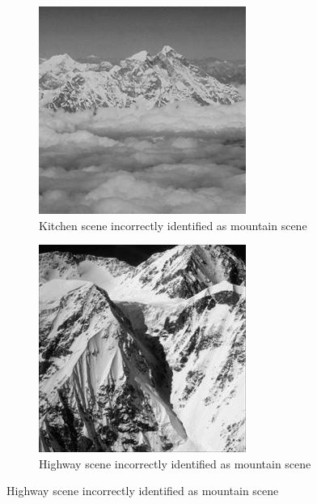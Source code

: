 \begin{homeworkProblem}
\begin{figure}[H]
\begin{subfigure}{0.5\textwidth}
    \end{subfigure}%
    \begin{subfigure}{0.5\textwidth}
      \centering
      \caption{Kitchen scene incorrectly identified as mountain scene}
      \includegraphics[width=.5\linewidth]{./images/own/moutain_kitchen_1.jpg}
    \end{subfigure}
    \begin{subfigure}{0.5\textwidth}
      \centering
      \caption{Highway scene incorrectly identified as mountain scene}
      \includegraphics[width=.5\linewidth]{./images/own/moutain_highway_1.jpg}
    \end{subfigure}%
  \end{figure}
\end{homeworkProblem}

\pagebreak

